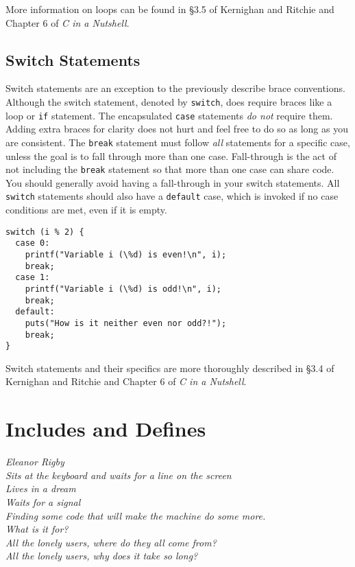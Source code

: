 \documentclass[11pt]{article}
\begin{document}
More information on loops can be found in \S 3.5 of Kernighan and Ritchie and Chapter 6 of \emph{C in a Nutshell}.

\subsection{Switch Statements}
Switch statements are an exception to the previously describe brace conventions.
Although the switch statement, denoted by \texttt{switch}, does
require braces like a loop or \texttt{if} statement. The encapsulated \texttt{case} statements
\emph{do not} require them. Adding extra
braces for clarity does not hurt and feel free to do so as long as you
are consistent. The \texttt{break} statement must follow \emph{all} statements for a
specific case, unless the goal is to fall through more than one case.
Fall-through is the act of not including the \texttt{break} statement so
that more than one case can share code. You should generally avoid having a
fall-through in your switch statements. All \texttt{switch} statements should also
have a \texttt{default} case, which is invoked if no case conditions are met,
even if it is empty.

\begin{lstlisting}
switch (i % 2) {
  case 0:
    printf("Variable i (\%d) is even!\n", i);
    break;
  case 1:
    printf("Variable i (\%d) is odd!\n", i);
    break;
  default:
    puts("How is it neither even nor odd?!");
    break;
}
\end{lstlisting}

Switch statements and their specifics are more thoroughly described in \S 3.4 of
Kernighan and Ritchie and Chapter 6 of \emph{C in a Nutshell}.

\section{Includes and Defines}
\textwidth
\epigraph{\emph{Eleanor Rigby \\
Sits at the keyboard and waits for a line on the screen \\
Lives in a dream \\
Waits for a signal \\
Finding some code that will make the machine do some more.  \\
What is it for? \\
All the lonely users, where do they all come from? \\
All the lonely users, why does it take so long?}}{}
\end{document}
